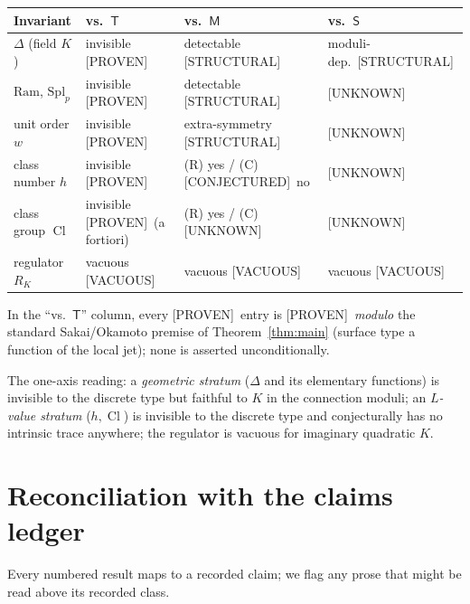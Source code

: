 \documentclass[11pt]{article}
\theoremstyle{definition}
\newcommand{\Cl}{\operatorname{Cl}}
\newcommand{\Tch}{\mathsf{T}}
\newcommand{\Mch}{\mathsf{M}}
\newcommand{\Stch}{\mathsf{S}}
\newcommand{\PROVEN}{\textsf{[PROVEN]}}
\newcommand{\STRUCTURAL}{\textsf{[STRUCTURAL]}}
\newcommand{\CONJ}{\textsf{[CONJECTURED]}}
\newcommand{\UNK}{\textsf{[UNKNOWN]}}
\newcommand{\VAC}{\textsf{[VACUOUS]}}
\begin{document}
\begin{center}\small
\begin{tabular}{l l l l}
\hline
Invariant & vs.\ $\Tch$ & vs.\ $\Mch$ & vs.\ $\Stch$\\
\hline
$\Delta$ (field $K$)     & invisible \PROVEN              & detectable \STRUCTURAL & moduli-dep.\ \STRUCTURAL\\
$\mathrm{Ram}$, $\mathrm{Spl}_p$ & invisible \PROVEN     & detectable \STRUCTURAL & \UNK\\
unit order $w$           & invisible \PROVEN             & extra-symmetry \STRUCTURAL & \UNK\\
class number $h$         & invisible \PROVEN             & (R) yes / (C) \CONJ\ no    & \UNK\\
class group $\Cl$        & invisible \PROVEN\ (a fortiori)& (R) yes / (C) \UNK         & \UNK\\
regulator $R_K$          & vacuous \VAC                  & vacuous \VAC               & vacuous \VAC\\
\hline
\end{tabular}
\end{center}

\noindent In the ``vs.\ $\Tch$'' column, every \PROVEN\ entry is \PROVEN\ \emph{modulo}
the standard Sakai/Okamoto premise of Theorem~\ref{thm:main} (surface type a function
of the local jet); none is asserted unconditionally.

\noindent The one-axis reading: a \emph{geometric stratum} ($\Delta$ and its
elementary functions) is invisible to the discrete type but faithful to $K$ in the
connection moduli; an \emph{$L$-value stratum} ($h,\Cl$) is invisible to the discrete
type and conjecturally has no intrinsic trace anywhere; the regulator is vacuous for
imaginary quadratic $K$.

\section{Reconciliation with the claims ledger}\label{sec:reconcile}

Every numbered result maps to a recorded claim; we flag any prose that might be read
above its recorded class.
\end{document}
